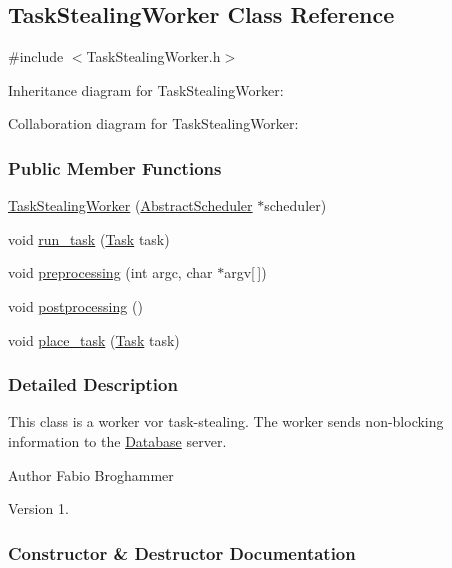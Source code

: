 \hypertarget{a00090}{}\subsection{Task\+Stealing\+Worker Class Reference}
\label{a00090}


{\ttfamily \#include $<$Task\+Stealing\+Worker.\+h$>$}



Inheritance diagram for Task\+Stealing\+Worker\+:


Collaboration diagram for Task\+Stealing\+Worker\+:
\subsubsection*{Public Member Functions}
\begin{DoxyCompactItemize}
\item 
\hyperlink{a00090_a51b370c7dd7e811fd4f0bf1bb35c6504}{Task\+Stealing\+Worker} (\hyperlink{a00005}{Abstract\+Scheduler} $\ast$scheduler)
\item 
void \hyperlink{a00090_aa3dd8530803573c2029dcf2c32d4d5ae}{run\+\_\+task} (\hyperlink{a00002}{Task} task)
\item 
void \hyperlink{a00090_a4bdc52bab41bf39d44191b419e879d4b}{preprocessing} (int argc, char $\ast$argv\mbox{[}$\,$\mbox{]})
\item 
void \hyperlink{a00090_ac0d27069ce08e1a7da4ff9245091adf4}{postprocessing} ()
\item 
void \hyperlink{a00090_afce5be5da1c09d4dce30d16fa12a896f}{place\+\_\+task} (\hyperlink{a00002}{Task} task)
\end{DoxyCompactItemize}


\subsubsection{Detailed Description}
This class is a worker vor task-\/stealing. The worker sends non-\/blocking information to the \hyperlink{a00018}{Database} server.

\begin{DoxyAuthor}{Author}
Fabio Broghammer 
\end{DoxyAuthor}
\begin{DoxyVersion}{Version}
1. 
\end{DoxyVersion}


\subsubsection{Constructor \& Destructor Documentation}
\hypertarget{a00090_a51b370c7dd7e811fd4f0bf1bb35c6504}{}
